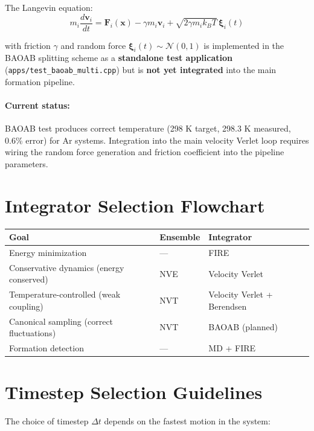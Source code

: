 \documentclass[11pt]{article}
\begin{document}
The Langevin equation:
\begin{equation}
m_i \frac{d\mathbf{v}_i}{dt} = \mathbf{F}_i(\mathbf{x}) - \gamma m_i \mathbf{v}_i + \sqrt{2\gamma m_i k_B T}\,\boldsymbol{\xi}_i(t)
\end{equation}

with friction $\gamma$ and random force $\boldsymbol{\xi}_i(t) \sim \mathcal{N}(0,1)$ is implemented in the BAOAB splitting scheme as a \textbf{standalone test application} (\texttt{apps/test\_baoab\_multi.cpp}) but is \textbf{not yet integrated} into the main formation pipeline.

\paragraph{Current status:} BAOAB test produces correct temperature (298 K target, 298.3 K measured, 0.6\% error) for Ar systems. Integration into the main velocity Verlet loop requires wiring the random force generation and friction coefficient into the pipeline parameters.

\section{Integrator Selection Flowchart}

\begin{center}
\begin{tabular}{lll}
\toprule
Goal & Ensemble & Integrator \\
\midrule
Energy minimization & — & FIRE \\
Conservative dynamics (energy conserved) & NVE & Velocity Verlet \\
Temperature-controlled (weak coupling) & NVT & Velocity Verlet + Berendsen \\
Canonical sampling (correct fluctuations) & NVT & BAOAB (planned) \\
Formation detection & — & MD + FIRE \\
\bottomrule
\end{tabular}
\end{center}

\section{Timestep Selection Guidelines}

The choice of timestep $\Delta t$ depends on the fastest motion in the system:
\end{document}
